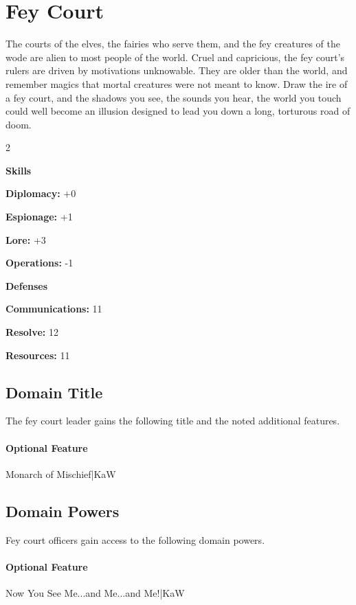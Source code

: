 \documentclass[10pt,a4paper,twoside,bg=print,twocolumn,openany,nodeprecatedcode]{dndbook}
\begin{document}
\section{Fey Court}
The courts of the elves, the fairies who serve them, and the fey creatures of the wode are alien to most people of the world. Cruel and capricious, the fey court's rulers are driven by motivations unknowable. They are older than the world, and remember magics that mortal creatures were not meant to know. Draw the ire of a fey court, and the shadows you see, the sounds you hear, the world you touch could well become an illusion designed to lead you down a long, torturous road of doom.


\begin{itemize}
\begin{multicols}{2}
\item \textbf{Skills}
\item \textbf{Diplomacy:} +0
\item \textbf{Espionage:} +1
\item \textbf{Lore:} +3
\item \textbf{Operations:} -1
\item \textbf{Defenses}
\item \textbf{Communications:} 11
\item \textbf{Resolve:} 12
\item \textbf{Resources:} 11
\end{multicols}

\end{itemize}

\subsection{Domain Title}
The fey court leader gains the following title and the noted additional features.

\paragraph{Optional Feature}
Monarch of Mischief|KaW

\subsection{Domain Powers}
Fey court officers gain access to the following domain powers.

\paragraph{Optional Feature}
Now You See Me...and Me...and Me!|KaW
\end{document}
